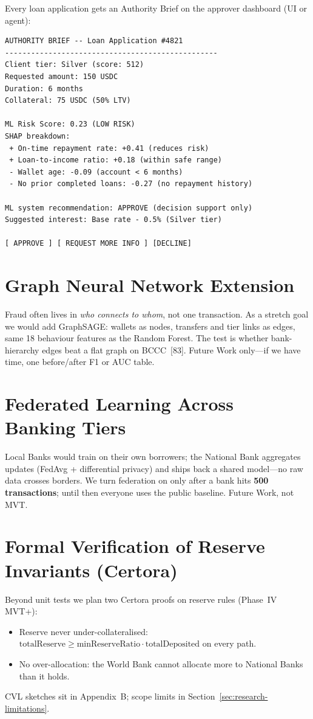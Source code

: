 \documentclass[12pt, a4paper]{report}
\begin{document}
Every loan application gets an Authority Brief on the approver dashboard (UI or agent):

\begin{verbatim}
AUTHORITY BRIEF -- Loan Application #4821
-------------------------------------------------
Client tier: Silver (score: 512)
Requested amount: 150 USDC
Duration: 6 months
Collateral: 75 USDC (50% LTV)

ML Risk Score: 0.23 (LOW RISK)
SHAP breakdown:
 + On-time repayment rate: +0.41 (reduces risk)
 + Loan-to-income ratio: +0.18 (within safe range)
 - Wallet age: -0.09 (account < 6 months)
 - No prior completed loans: -0.27 (no repayment history)

ML system recommendation: APPROVE (decision support only)
Suggested interest: Base rate - 0.5% (Silver tier)

[ APPROVE ] [ REQUEST MORE INFO ] [DECLINE]
\end{verbatim}

\section{Graph Neural Network Extension}
\label{sec:gnn-extension}

Fraud often lives in \textit{who connects to whom}, not one transaction. As a stretch goal we would add GraphSAGE: wallets as nodes, transfers and tier links as edges, same 18 behaviour features as the Random Forest. The test is whether bank-hierarchy edges beat a flat graph on BCCC~[83]. Future Work only---if we have time, one before/after F1 or AUC table.

\section{Federated Learning Across Banking Tiers}
\label{sec:fl-fraud}

Local Banks would train on their own borrowers; the National Bank aggregates updates (FedAvg + differential privacy) and ships back a shared model---no raw data crosses borders. We turn federation on only after a bank hits \textbf{500 transactions}; until then everyone uses the public baseline. Future Work, not MVT.

\section{Formal Verification of Reserve Invariants (Certora)}
\label{sec:certora}

Beyond unit tests we plan two Certora proofs on reserve rules (Phase~IV MVT+):
\begin{itemize}[noitemsep]
\item Reserve never under-collateralised: \(\mathrm{totalReserve} \ge \mathrm{minReserveRatio} \cdot \mathrm{totalDeposited}\) on every path.
\item No over-allocation: the World Bank cannot allocate more to National Banks than it holds.
\end{itemize}
CVL sketches sit in Appendix~B; scope limits in Section~\ref{sec:research-limitations}.
\end{document}
